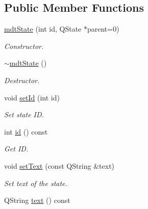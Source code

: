 \subsection*{Public Member Functions}
\begin{DoxyCompactItemize}
\item 
\hyperlink{classmdt_state_a8a6c3059b9ace83fc20feb0fcc7159df}{mdtState} (int id, QState $\ast$parent=0)
\begin{DoxyCompactList}\small\item\em Constructor. \end{DoxyCompactList}\item 
\hypertarget{classmdt_state_a64560fbb87511491a0247d0c0ec9613a}{
\hyperlink{classmdt_state_a64560fbb87511491a0247d0c0ec9613a}{$\sim$mdtState} ()}
\label{classmdt_state_a64560fbb87511491a0247d0c0ec9613a}

\begin{DoxyCompactList}\small\item\em Destructor. \end{DoxyCompactList}\item 
void \hyperlink{classmdt_state_aece398b67e5bd5a6d1bcc83f109a1dff}{setId} (int id)
\begin{DoxyCompactList}\small\item\em Set state ID. \end{DoxyCompactList}\item 
int \hyperlink{classmdt_state_a034345dce9f3d0c976d5987bd42dc1cf}{id} () const 
\begin{DoxyCompactList}\small\item\em Get ID. \end{DoxyCompactList}\item 
\hypertarget{classmdt_state_a29e0ba7724b674ee25954a89c66544e2}{
void \hyperlink{classmdt_state_a29e0ba7724b674ee25954a89c66544e2}{setText} (const QString \&text)}
\label{classmdt_state_a29e0ba7724b674ee25954a89c66544e2}

\begin{DoxyCompactList}\small\item\em Set text of the state. \end{DoxyCompactList}\item 
\hypertarget{classmdt_state_ab6dabbc771acb33f16c3caf169414d53}{
QString \hyperlink{classmdt_state_ab6dabbc771acb33f16c3caf169414d53}{text} () const }
\label{classmdt_state_ab6dabbc771acb33f16c3caf169414d53}


\end{DoxyCompactItemize}
